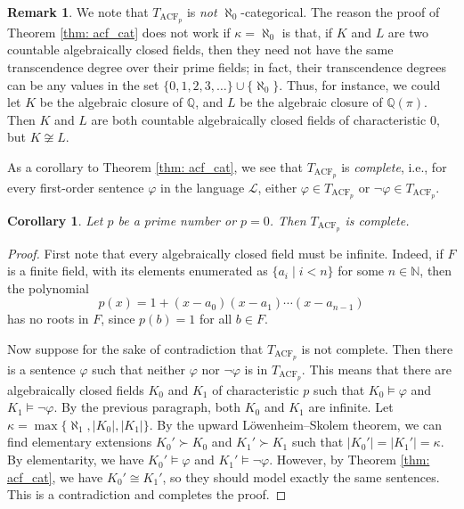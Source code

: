 \documentclass[a4paper]{memoir}
\newtheorem{corollary}[theorem]{Corollary}
\theoremstyle{definition}
\newtheorem{remark}[theorem]{Remark}
\newcommand{\bb}{\mathbb}
\begin{document}
\begin{remark}
  We note that $T_{\mathrm{ACF}_p}$ is \emph{not} $\aleph_0$-categorical. 
  The reason the proof of Theorem \ref{thm: acf_cat} does not work 
  if $\kappa = \aleph_0$ is that, if $K$ and $L$ are two countable algebraically 
  closed fields, then they need not have the same transcendence degree over 
  their prime fields; in fact, their transcendence degrees can be any values in 
  the set $\{0,1,2,3,\ldots\} \cup \{\aleph_0\}$. Thus, for instance, we could 
  let $K$ be the algebraic closure of $\bb{Q}$, and $L$ be the algebraic 
  closure of $\bb{Q}(\pi)$. Then $K$ and $L$ are both countable algebraically closed 
  fields of characteristic $0$, but $K \not\cong L$.
\end{remark}

As a corollary to Theorem \ref{thm: acf_cat}, we see that $T_{\mathrm{ACF}_p}$ 
is \emph{complete}, i.e., for every first-order sentence $\varphi$ in the language 
$\mathcal{L}$, either $\varphi \in T_{\mathrm{ACF}_p}$ or $\neg \varphi \in T_{\mathrm{ACF}_p}$.

\begin{corollary}
  Let $p$ be a prime number or $p = 0$. Then $T_{\mathrm{ACF}_p}$ is complete.
\end{corollary}

\begin{proof}
  First note that every algebraically closed field must be infinite. Indeed, if $F$ is a 
  finite field, with its elements enumerated as $\{a_i \mid i < n\}$ for some 
  $n \in \bb{N}$, then the polynomial 
  \[
    p(x) = 1 + (x -  a_0)(x - a_1) \cdots (x-a_{n-1})
  \]
  has no roots in $F$, since $p(b) = 1$ for all $b \in F$.
  
  Now suppose for the sake of contradiction that $T_{\mathrm{ACF}_p}$ is not complete. 
  Then there is a sentence $\varphi$ such that neither $\varphi$ nor $\neg \varphi$ 
  is in $T_{\mathrm{ACF}_p}$. This means that there are algebraically closed 
  fields $K_0$ and $K_1$ of characteristic $p$ such that $K_0 \models \varphi$ 
  and $K_1 \models \neg \varphi$. By the previous paragraph, both $K_0$ and $K_1$ are 
  infinite. Let $\kappa = \max\{\aleph_1, |K_0|, |K_1|\}$. By the upward 
  L\"{o}wenheim--Skolem theorem, we can find elementary extensions $K_0' \succ K_0$ and 
  $K_1' \succ K_1$ such that $|K_0'| = |K_1'| = \kappa$. By elementarity, we 
  have $K_0' \models \varphi$ and $K_1' \models \neg \varphi$. However, by Theorem 
  \ref{thm: acf_cat}, we have $K_0' \cong K_1'$, so they should model exactly the same 
  sentences. This is a contradiction and completes the proof.
\end{proof}
\end{document}
